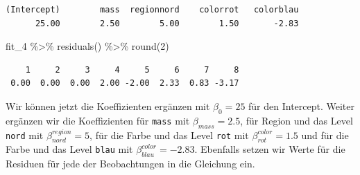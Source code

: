 \documentclass[
  letterpaper,
]{scrbook}
\newenvironment{Shaded}{\begin{snugshade}}{\end{snugshade}}
\newcommand{\DecValTok}[1]{\textcolor[rgb]{0.68,0.00,0.00}{#1}}
\newcommand{\FunctionTok}[1]{\textcolor[rgb]{0.28,0.35,0.67}{#1}}
\newcommand{\NormalTok}[1]{\textcolor[rgb]{0.00,0.23,0.31}{#1}}
\newcommand{\SpecialCharTok}[1]{\textcolor[rgb]{0.37,0.37,0.37}{#1}}
\begin{document}
\begin{verbatim}
(Intercept)        mass  regionnord    colorrot   colorblau 
      25.00        2.50        5.00        1.50       -2.83 
\end{verbatim}

\begin{Shaded}
\begin{Highlighting}[]
\NormalTok{fit\_4 }\SpecialCharTok{\%\textgreater{}\%} \FunctionTok{residuals}\NormalTok{() }\SpecialCharTok{\%\textgreater{}\%} \FunctionTok{round}\NormalTok{(}\DecValTok{2}\NormalTok{)}
\end{Highlighting}
\end{Shaded}

\begin{verbatim}
    1     2     3     4     5     6     7     8 
 0.00  0.00  0.00  2.00 -2.00  2.33  0.83 -3.17 
\end{verbatim}

Wir können jetzt die Koeffizienten ergänzen mit \(\beta_0 = 25\) für den
Intercept. Weiter ergänzen wir die Koeffizienten für \texttt{mass} mit
\(\beta_{mass}=2.5\), für Region und das Level \texttt{nord} mit
\(\beta^{region}_{nord} = 5\), für die Farbe und das Level \texttt{rot}
mit \(\beta^{color}_{rot} = 1.5\) und für die Farbe und das Level
\texttt{blau} mit \(\beta^{color}_{blau} = -2.83\). Ebenfalls setzen wir
Werte für die Residuen für jede der Beobachtungen in die Gleichung ein.
\end{document}
